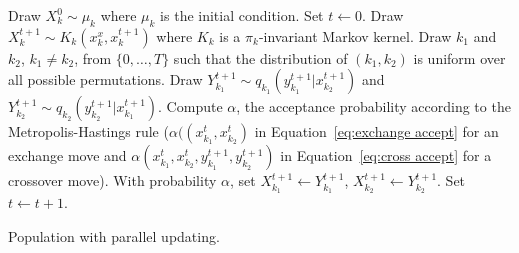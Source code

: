\begin{algorithm}
\begin{algorithmic}
  \tophrule
    \STATE Draw $X_k^0\sim\mu_k$ where $\mu_k$ is the initial condition.
  \ENDFOR
  \STATE Set $t\leftarrow0$.
  \REPEAT
      \STATE Draw $X_k^{t+1}\sim K_k(x_k^x,x_k^{t+1})$ where $K_k$ is a
      $\pi_k$-invariant Markov kernel.
    \ENDFOR
    \STATE Draw $k_1$ and $k_2$, $k_1\ne k_2$, from $\{0,\dots,T\}$ such that
    the distribution of $(k_1,k_2)$ is uniform over all possible permutations.
    \STATE Draw $Y_{k_1}^{t+1}\sim q_{k_1}(y_{k_1}^{t+1}|x_{k_2}^{t+1})$ and
    $Y_{k_2}^{t+1}\sim q_{k_2}(y_{k_2}^{t+1}|x_{k_1}^{t+1})$.
    \STATE Compute $\alpha$, the acceptance probability according to the
    Metropolis-Hastings rule ($\alpha((x_{k_1}^t,x_{k_2}^t)$ in Equation~\eqref{eq:exchange accept} for an exchange move and $\alpha(x_{k_1}^t,x_{k_2}^t,y_{k_1}^{t+1},y_{k_2}^{t+1})$ in Equation~\eqref{eq:cross accept} for a crossover move). With probability $\alpha$, set
    $X_{k_1}^{t+1}\leftarrow Y_{k_1}^{t+1}$, $X_{k_2}^{t+1}\leftarrow
    Y_{k_2}^{t+1}$.
    \STATE Set $t\leftarrow t+1$.
  \bottomhrule
\end{algorithmic}
\caption{Population \mcmc with parallel updating.}
\label{alg:pmcmc}
\end{algorithm}
